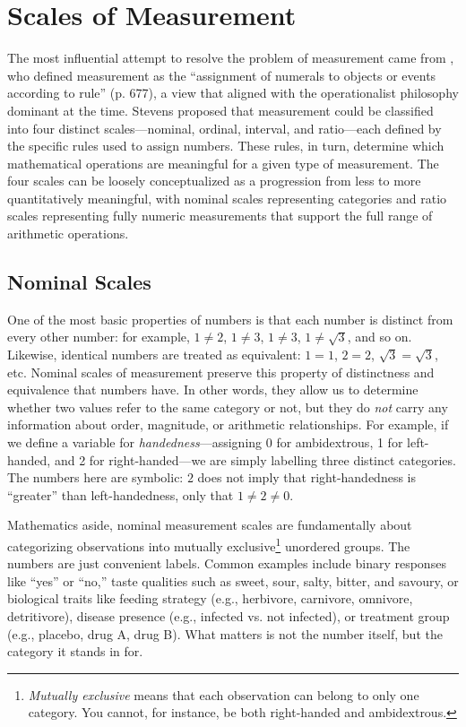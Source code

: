 \section{Scales of Measurement}

The most influential attempt to resolve the problem of measurement came from \textcite{Stevens1946}, who defined measurement as the ``assignment of numerals to objects or events according to rule'' (p. 677), a view that aligned with the operationalist philosophy dominant at the time. Stevens proposed that measurement could be classified into four distinct scales—nominal, ordinal, interval, and ratio—each defined by the specific rules used to assign numbers. These rules, in turn, determine which mathematical operations are meaningful for a given type of measurement. The four scales can be loosely conceptualized as a progression from less to more quantitatively meaningful, with nominal scales representing categories and ratio scales representing fully numeric measurements that support the full range of arithmetic operations.

\subsection{Nominal Scales}

One of the most basic properties of numbers is that each number is distinct from every other number: for example, $1 \neq 2$, $1 \neq 3$, $1 \neq 3$, $1 \neq \sqrt{3}$, and so on. Likewise, identical numbers are treated as equivalent: $1 = 1$, $2 = 2$, $\sqrt{3} = \sqrt{3}$, etc. Nominal scales of measurement preserve this property of distinctness and equivalence that numbers have. In other words, they allow us to determine whether two values refer to the same category or not, but they do \textit{not} carry any information about order, magnitude, or arithmetic relationships. For example, if we define a variable for \textit{handedness}—assigning 0 for ambidextrous, 1 for left-handed, and 2 for right-handed—we are simply labelling three distinct categories. The numbers here are symbolic: $2$ does not imply that right-handedness is ``greater'' than left-handedness, only that $1 \neq 2 \neq 0$.

Mathematics aside, nominal measurement scales are fundamentally about categorizing observations into mutually exclusive\footnote{\textit{Mutually exclusive} means that each observation can belong to only one category. You cannot, for instance, be both right-handed and ambidextrous.} unordered groups. The numbers are just convenient labels. Common examples include binary responses like ``yes'' or ``no,'' taste qualities such as sweet, sour, salty, bitter, and savoury, or biological traits like feeding strategy (e.g., herbivore, carnivore, omnivore, detritivore), disease presence (e.g., infected vs. not infected), or treatment group (e.g., placebo, drug A, drug B). What matters is not the number itself, but the category it stands in for. 

